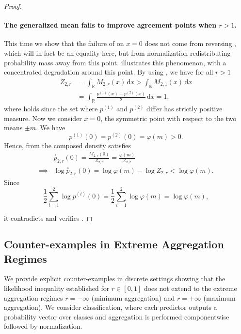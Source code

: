 \documentclass[accepted]{uai2026} %
\newcommand{\R}{\mathbb{R}}
\newcommand{\compose}[1]{\overset{\circ}{#1}}
\begin{document}
\begin{proof}
\paragraph{The generalized mean fails to improve agreement points when $r>1$.} This time we show that the failure of  on $x = 0$ does not come from reversing , which will in fact be an equality here, but from normalization redistributing probability mass away from this point.  illustrates this phenomenon, with a concentrated degradation around this point. By using , we have for all $r>1$
\begin{align}\label{eq: Z gaussian inequality}
Z_{2,r}
&= \int_{\R} M_{2,r}(x)\,\mathrm{d}x
> \int_{\R} M_{2,1}(x)\,\mathrm{d}x  \\
&= \int_{\R} \frac{p^{(1)}(x) + p^{(2)}(x)}{2}\,\mathrm{d}x
= 1 .
\end{align}
where  holds since the set where $p^{(1)}$ and $p^{(2)}$ differ has strictly positive measure. Now we consider $x=0$, the symmetric point with respect to the two means $\pm m$. We have
\begin{equation}\label{eq: symmetry}
p^{(1)}(0) = p^{(2)}(0) = \varphi(m) > 0.
\end{equation}
Hence, from  the composed density satisfies
\begin{align}
& \compose{p}_{2,r}(0)
= \frac{M_{2,r}(0)}{Z_{2,r}}
= \frac{\varphi(m)}{Z_{2,r}} \\
\implies &\log \compose{p}_{2,r}(0)
= \log \varphi(m) - \log Z_{2,r}
< \log \varphi(m).
\end{align}
Since 
\begin{equation}
\frac{1}{2} \sum_{i=1}^2 \log p^{(i)}(0) = \frac{1}{2} \sum_{i=1}^2 \log \varphi(m) =  \log \varphi(m),
\end{equation}

it contradicts  and verifies .
\end{proof}

\subsection{Counter-examples in Extreme Aggregation Regimes}
\label{appendix:extreme_counterexamples}

We provide explicit counter-examples in discrete settings  showing
that the likelihood inequality established for
$r \in [0,1]$ does not extend to the extreme aggregation
regimes $r=-\infty$ (minimum aggregation) and
$r=+\infty$ (maximum aggregation). We consider classification, where each predictor outputs a
probability vector over classes and aggregation is performed
componentwise followed by normalization.
\end{document}
